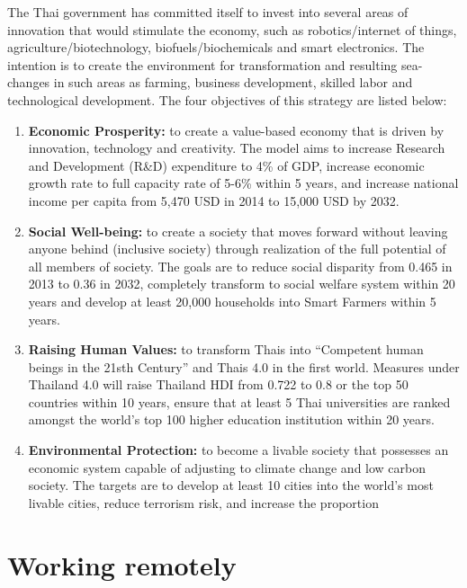 \documentclass[]{book}
\providecommand{\tightlist}{%
  \setlength{\itemsep}{0pt}\setlength{\parskip}{0pt}}
\begin{document}
The Thai government has committed itself to invest into several areas of innovation that would stimulate the economy, such as robotics/internet of things, agriculture/biotechnology, biofuels/biochemicals and smart electronics.\citep{TMC2016} The intention is to create the environment for transformation and resulting sea-changes in such areas as farming, business development, skilled labor and technological development. The four objectives of this strategy are listed below:\citep{RTE2016}

\begin{enumerate}
\def\labelenumi{\arabic{enumi}.}
\tightlist
\item
  \textbf{Economic Prosperity:} to create a value-based economy that is driven by innovation, technology and creativity. The model aims to increase Research and Development (R\&D) expenditure to 4\% of GDP, increase economic growth rate to full capacity rate of 5-6\% within 5 years, and increase national income per capita from 5,470 USD in 2014 to 15,000 USD by 2032.
\item
  \textbf{Social Well-being:} to create a society that moves forward without leaving anyone behind (inclusive society) through realization of the full potential of all members of society. The goals are to reduce social disparity from 0.465 in 2013 to 0.36 in 2032, completely transform to social welfare system within 20 years and develop at least 20,000 households into Smart Farmers within 5 years.
\item
  \textbf{Raising Human Values:} to transform Thais into ``Competent human beings in the 21sth Century'' and Thais 4.0 in the first world. Measures under Thailand 4.0 will raise Thailand HDI from 0.722 to 0.8 or the top 50 countries within 10 years, ensure that at least 5 Thai universities are ranked amongst the world's top 100 higher education institution within 20 years.
\item
  \textbf{Environmental Protection:} to become a livable society that possesses an economic system capable of adjusting to climate change and low carbon society. The targets are to develop at least 10 cities into the world's most livable cities, reduce terrorism risk, and increase the proportion
\end{enumerate}

\hypertarget{working-remotely}{%
\chapter{Working remotely}\label{working-remotely}}
\end{document}
